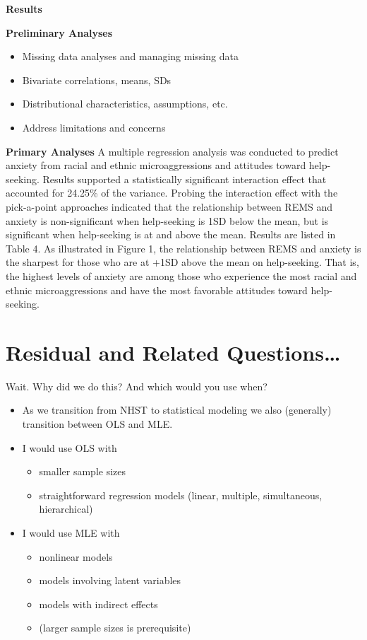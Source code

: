 \documentclass[
]{book}
\providecommand{\tightlist}{%
  \setlength{\itemsep}{0pt}\setlength{\parskip}{0pt}}
\begin{document}
\textbf{Results}

\textbf{Preliminary Analyses}

\begin{itemize}
\tightlist
\item
  Missing data analyses and managing missing data
\item
  Bivariate correlations, means, SDs
\item
  Distributional characteristics, assumptions, etc.
\item
  Address limitations and concerns
\end{itemize}

\textbf{Primary Analyses}
A multiple regression analysis was conducted to predict anxiety from racial and ethnic microaggressions and attitudes toward help-seeking. Results supported a statistically significant interaction effect that accounted for 24.25\% of the variance. Probing the interaction effect with the pick-a-point approaches indicated that the relationship between REMS and anxiety is non-significant when help-seeking is 1SD below the mean, but is significant when help-seeking is at and above the mean. Results are listed in Table 4. As illustrated in Figure 1, the relationship between REMS and anxiety is the sharpest for those who are at +1SD above the mean on help-seeking. That is, the highest levels of anxiety are among those who experience the most racial and ethnic microaggressions and have the most favorable attitudes toward help-seeking.

\hypertarget{residual-and-related-questions-1}{%
\section{Residual and Related Questions\ldots{}}\label{residual-and-related-questions-1}}

Wait. Why did we do this? And which would you use when?

\begin{itemize}
\tightlist
\item
  As we transition from NHST to statistical modeling we also (generally) transition between OLS and MLE.
\item
  I would use OLS with

  \begin{itemize}
  \tightlist
  \item
    smaller sample sizes
  \item
    straightforward regression models (linear, multiple, simultaneous, hierarchical)
  \end{itemize}
\item
  I would use MLE with

  \begin{itemize}
  \tightlist
  \item
    nonlinear models
  \item
    models involving latent variables
  \item
    models with indirect effects
  \item
    (larger sample sizes is prerequisite)
  \end{itemize}
\end{itemize}
\end{document}

